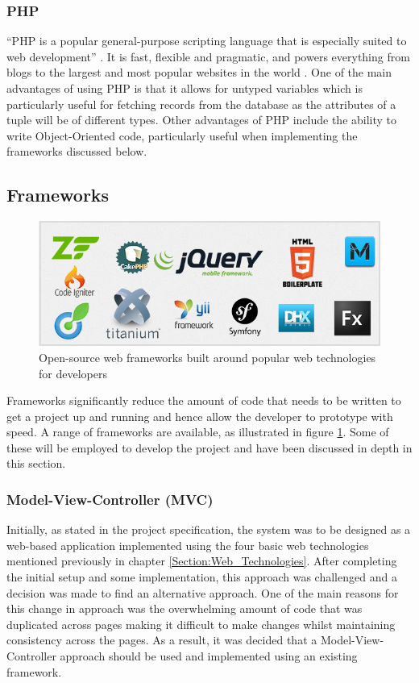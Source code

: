 \subsubsection{PHP} 
``PHP is a popular general-purpose scripting language that is especially suited to web development'' \cite{PHP:Home}. It is fast, flexible and pragmatic, and powers everything from blogs to the largest and most popular websites in the world \cite{PHP:Home}. One of the main advantages of using PHP is that it allows for untyped variables which is particularly useful for fetching records from the database as the attributes of a tuple will be of different types. Other advantages of PHP include the ability to write Object-Oriented code, particularly useful when implementing the frameworks discussed below.

\subsection{Frameworks}
\begin{figure}[H]
  \centering
  \includegraphics[width=1.0\textwidth]{Images/Research/Technologies/WebFrameworks}
  \caption{Open-source web frameworks built around popular web technologies for developers} \label{fig:WebFrameworks} 
\end{figure}

Frameworks significantly reduce the amount of code that needs to be written to get a project up and running and hence allow the developer to prototype with speed. A range of frameworks are available, as illustrated in figure \ref{fig:WebFrameworks}. Some of these will be employed to develop the project and have been discussed in depth in this section.

\subsubsection{Model-View-Controller (MVC)}
Initially, as stated in the project specification, the system was to be designed as a web-based application implemented using the four basic web technologies mentioned previously in chapter \ref{Section:Web_Technologies}. After completing the initial setup and some implementation, this approach was challenged and a decision was made to find an alternative approach. One of the main reasons for this change in approach was the overwhelming amount of code that was duplicated across pages making it difficult to make changes whilst maintaining consistency across the pages. As a result, it was decided that a Model-View-Controller approach should be used and implemented using an existing framework.

